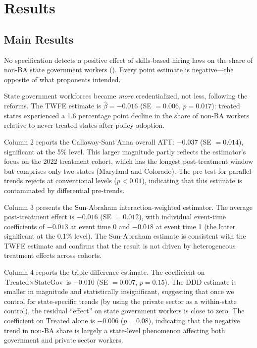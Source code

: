 \documentclass[12pt]{article}
\begin{document}
\section{Results} \label{sec:results}

\subsection{Main Results}

No specification detects a positive effect of skills-based hiring laws on the share of non-BA state government workers (). Every point estimate is negative---the opposite of what proponents intended.

State government workforces became \emph{more} credentialized, not less, following the reforms. The TWFE estimate is $\hat{\beta} = -0.016$ (SE $= 0.006$, $p = 0.017$): treated states experienced a 1.6 percentage point decline in the share of non-BA workers relative to never-treated states after policy adoption.

Column 2 reports the Callaway-Sant'Anna overall ATT: $-0.037$ (SE $= 0.014$), significant at the 5\% level. This larger magnitude partly reflects the estimator's focus on the 2022 treatment cohort, which has the longest post-treatment window but comprises only two states (Maryland and Colorado). The pre-test for parallel trends rejects at conventional levels ($p < 0.01$), indicating that this estimate is contaminated by differential pre-trends.

Column 3 presents the Sun-Abraham interaction-weighted estimator. The average post-treatment effect is $-0.016$ (SE $= 0.012$), with individual event-time coefficients of $-0.013$ at event time 0 and $-0.018$ at event time 1 (the latter significant at the 0.1\% level). The Sun-Abraham estimate is consistent with the TWFE estimate and confirms that the result is not driven by heterogeneous treatment effects across cohorts.

Column 4 reports the triple-difference estimate. The coefficient on $\text{Treated} \times \text{StateGov}$ is $-0.010$ (SE $= 0.007$, $p = 0.15$). The DDD estimate is smaller in magnitude and statistically insignificant, suggesting that once we control for state-specific trends (by using the private sector as a within-state control), the residual ``effect'' on state government workers is close to zero. The coefficient on $\text{Treated}$ alone is $-0.006$ ($p = 0.08$), indicating that the negative trend in non-BA share is largely a state-level phenomenon affecting both government and private sector workers.
\end{document}
